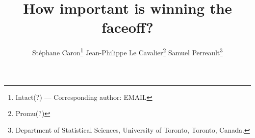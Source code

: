 \usepackage{bbm}

\usepackage[margin=1in]{geometry} %


\title{How important is winning the faceoff?}

\author{
Stéphane Caron\footnote{Intact(?) --- Corresponding author: EMAIL} \qquad
Jean-Philippe Le Cavalier\footnote{Promu(?)}  \qquad
Samuel Perreault\footnote{Department of Statistical Sciences, University of Toronto, Toronto, Canada.}
}

